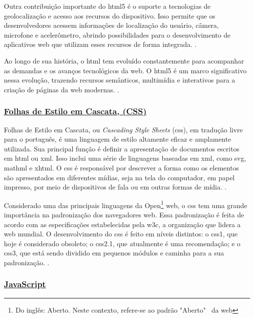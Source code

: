 Outra contribuição importante do
\acrshort{html}5
é o suporte a tecnologias de
geolocalização e acesso aos recursos do dispositivo. Isso permite que os desenvolvedores
acessem informações de localização do usuário, câmera, microfone e acelerômetro, abrindo
possibilidades para o desenvolvimento de aplicativos web que utilizam esses recursos de
forma integrada.
\cite{w3c}.

Ao longo de sua história, o
\acrshort{html}
tem evoluído constantemente para acompanhar as
demandas e os avanços tecnológicos da web. O
\acrshort{html}5
é um marco significativo nessa
evolução, trazendo recursos semânticos, multimídia e interativos para a criação de páginas da
web modernas.
\cite{w3c}.

\subsubsection{\underline{Folhas de Estilo em Cascata, (CSS)}}

Folhas de Estilo em Cascata, ou \textit{Cascading Style Sheets}
(\acrshort{css}),
em tradução livre
para o português, é uma linguagem de estilo altamente eficaz e amplamente utilizada. Sua
principal função é definir a apresentação de documentos escritos em
\acrshort{html}
ou
\acrshort{xml}.
Isso
inclui uma série de linguagens baseadas em
\acrshort{xml},
como
\acrshort{svg},
\acrshort{mathml}
e
\acrshort{xhtml}.
O
\acrshort{css}
é
responsável por descrever a forma como os elementos são apresentados em diferentes mídias,
seja na tela do computador, em papel impresso, por meio de dispositivos de fala ou em outras
formas de mídia.
\cite{mdn-css}.

Considerado uma das principais linguagens da
Open\footnote{Do inglês: Aberto. Neste contexto, refere-se ao padrão "Aberto"~ da
    \acrshort{web}
}
\acrshort{web},
o
\acrshort{css}
tem uma grande
importância na padronização dos navegadores
\acrshort{web}.
Essa padronização é feita de acordo com
as especificações estabelecidas pela
\acrshort{w3c},
a organização que lidera a
\acrshort{web}
mundial. O
desenvolvimento do
\acrshort{css}
é feito em níveis distintos: o
\acrshort{css}1,
que hoje é considerado
obsoleto; o
\acrshort{css}2.1,
que atualmente é uma recomendação; e o
\acrshort{css}3,
que está sendo dividido
em pequenos módulos e caminha para a sua padronização.
\cite{mdn-css}.

\subsubsection{\underline{JavaScript}}

